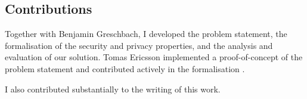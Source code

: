 
\subsection{Contributions}
    \label{subsection:contributions-dss}
Together with Benjamin Greschbach, I developed the problem statement, the formalisation 
of the security and privacy properties, and the analysis and evaluation of our solution. 
Tomas Ericsson implemented a proof-of-concept of the problem statement and contributed 
actively in the formalisation \cite{Ericsson15}.

I also contributed substantially to the writing of this work.


